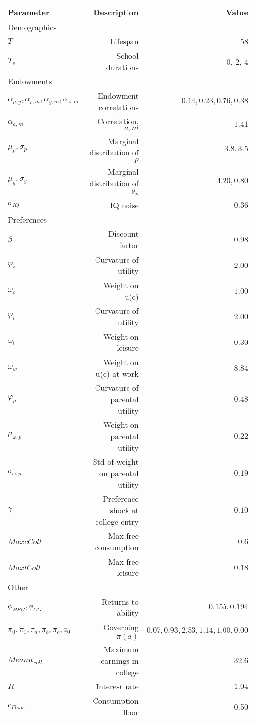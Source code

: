 \begin{tabular}{lrr}
\hline
Parameter & Description  & Value  \\ 
\hline
Demographics &   &   \\ 
$T$ & Lifespan  & 58  \\ 
$T_{s}$ & School durations  & 0, 2, 4  \\ 
Endowments &   &   \\ 
$\alpha_{p,y}, \alpha_{p,m}, \alpha_{y,m}, \alpha_{\omega,m}$ & Endowment correlations  & $-0.14, 0.23, 0.76, 0.38$  \\ 
$\alpha_{a,m}$ & Correlation, $a,m$  & $1.41$  \\ 
$\mu_{p}, \sigma_{p}$ & Marginal distribution of $p$  & $3.8, 3.5$  \\ 
$\mu_{y}, \sigma_{y}$ & Marginal distribution of $y_{p}$  & $4.20, 0.80$  \\ 
$\sigma_{IQ}$ & IQ noise  & $0.36$  \\ 
Preferences &   &   \\ 
$\beta$ & Discount factor  & $0.98$  \\ 
$\varphi_{c}$ & Curvature of utility  & $2.00$  \\ 
$\omega_{c}$ & Weight on u(c)  & $1.00$  \\ 
$\varphi_{l}$ & Curvature of utility  & $2.00$  \\ 
$\omega_{l}$ & Weight on leisure  & $0.30$  \\ 
$\omega_{w}$ & Weight on u(c) at work  & $8.84$  \\ 
$\varphi_{p}$ & Curvature of parental utility  & $0.48$  \\ 
$\mu_{\omega,p}$ & Weight on parental utility  & $0.22$  \\ 
$\sigma_{\omega,p}$ & Std of weight on parental utility  & $0.19$  \\ 
$\gamma$ & Preference shock at college entry  & $0.10$  \\ 
$Max cColl$ & Max free consumption  & $0.6$  \\ 
$Max lColl$ & Max free leisure  & $0.18$  \\ 
Other &   &   \\ 
$\phi_{HSG}, \phi_{CG}$ & Returns to ability  & $0.155, 0.194$  \\ 
$\pi_{0}, \pi_{1}, \pi_{a}, \pi_{b}, \pi_{c}, a_{0}$ & Governing $\pi(a)$  & $0.07, 0.93, 2.53, 1.14, 1.00, 0.00$  \\ 
$Mean w_{coll}$ & Maximum earnings in college  & $32.6$  \\ 
$R$ & Interest rate  & $1.04$  \\ 
$c_{Floor}$ & Consumption floor  & 0.50  \\ 
\hline
\end{tabular}%
